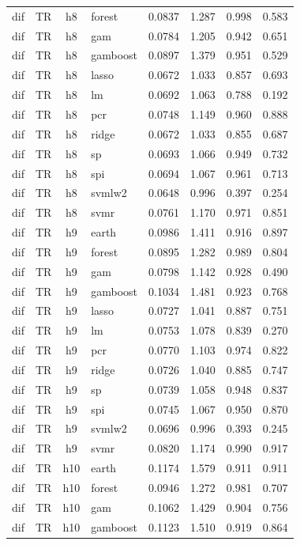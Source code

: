 \begin{ThreePartTable}
\begin{longtable}[t]{llclcccc}
dif & TR & h8 & forest & 0.0837 & 1.287 & 0.998 & 0.583\\
dif & TR & h8 & gam & 0.0784 & 1.205 & 0.942 & 0.651\\
dif & TR & h8 & gamboost & 0.0897 & 1.379 & 0.951 & 0.529\\
dif & TR & h8 & lasso & 0.0672 & 1.033 & 0.857 & 0.693\\
dif & TR & h8 & lm & 0.0692 & 1.063 & 0.788 & 0.192\\
dif & TR & h8 & pcr & 0.0748 & 1.149 & 0.960 & 0.888\\
dif & TR & h8 & ridge & 0.0672 & 1.033 & 0.855 & 0.687\\
dif & TR & h8 & sp & 0.0693 & 1.066 & 0.949 & 0.732\\
dif & TR & h8 & spi & 0.0694 & 1.067 & 0.961 & 0.713\\
dif & TR & h8 & svmlw2 & 0.0648 & 0.996 & 0.397 & 0.254\\
dif & TR & h8 & svmr & 0.0761 & 1.170 & 0.971 & 0.851\\
\addlinespace
dif & TR & h9 & earth & 0.0986 & 1.411 & 0.916 & 0.897\\
dif & TR & h9 & forest & 0.0895 & 1.282 & 0.989 & 0.804\\
dif & TR & h9 & gam & 0.0798 & 1.142 & 0.928 & 0.490\\
dif & TR & h9 & gamboost & 0.1034 & 1.481 & 0.923 & 0.768\\
dif & TR & h9 & lasso & 0.0727 & 1.041 & 0.887 & 0.751\\
dif & TR & h9 & lm & 0.0753 & 1.078 & 0.839 & 0.270\\
dif & TR & h9 & pcr & 0.0770 & 1.103 & 0.974 & 0.822\\
dif & TR & h9 & ridge & 0.0726 & 1.040 & 0.885 & 0.747\\
dif & TR & h9 & sp & 0.0739 & 1.058 & 0.948 & 0.837\\
dif & TR & h9 & spi & 0.0745 & 1.067 & 0.950 & 0.870\\
dif & TR & h9 & svmlw2 & 0.0696 & 0.996 & 0.393 & 0.245\\
dif & TR & h9 & svmr & 0.0820 & 1.174 & 0.990 & 0.917\\
\addlinespace
dif & TR & h10 & earth & 0.1174 & 1.579 & 0.911 & 0.911\\
dif & TR & h10 & forest & 0.0946 & 1.272 & 0.981 & 0.707\\
dif & TR & h10 & gam & 0.1062 & 1.429 & 0.904 & 0.756\\
dif & TR & h10 & gamboost & 0.1123 & 1.510 & 0.919 & 0.864\\

\end{longtable}
\end{ThreePartTable}
